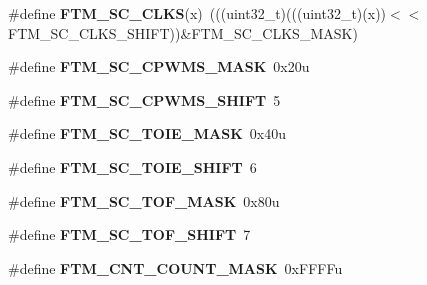 \begin{DoxyCompactItemize}
\item 
\#define {\bfseries F\+T\+M\+\_\+\+S\+C\+\_\+\+C\+L\+KS}(x)~(((uint32\+\_\+t)(((uint32\+\_\+t)(x))$<$$<$F\+T\+M\+\_\+\+S\+C\+\_\+\+C\+L\+K\+S\+\_\+\+S\+H\+I\+FT))\&F\+T\+M\+\_\+\+S\+C\+\_\+\+C\+L\+K\+S\+\_\+\+M\+A\+SK)\hypertarget{group__FTM__Register__Masks_ga4c0b108bf05899c019de06f311cb5c89}{}\label{group__FTM__Register__Masks_ga4c0b108bf05899c019de06f311cb5c89}

\item 
\#define {\bfseries F\+T\+M\+\_\+\+S\+C\+\_\+\+C\+P\+W\+M\+S\+\_\+\+M\+A\+SK}~0x20u\hypertarget{group__FTM__Register__Masks_gaccb41101ca573d24de634c5a19d13467}{}\label{group__FTM__Register__Masks_gaccb41101ca573d24de634c5a19d13467}

\item 
\#define {\bfseries F\+T\+M\+\_\+\+S\+C\+\_\+\+C\+P\+W\+M\+S\+\_\+\+S\+H\+I\+FT}~5\hypertarget{group__FTM__Register__Masks_ga91d4d626c21437a2b8b15e9a2a385727}{}\label{group__FTM__Register__Masks_ga91d4d626c21437a2b8b15e9a2a385727}

\item 
\#define {\bfseries F\+T\+M\+\_\+\+S\+C\+\_\+\+T\+O\+I\+E\+\_\+\+M\+A\+SK}~0x40u\hypertarget{group__FTM__Register__Masks_ga65e89cf2978e1c61f40b229b66b3e7c8}{}\label{group__FTM__Register__Masks_ga65e89cf2978e1c61f40b229b66b3e7c8}

\item 
\#define {\bfseries F\+T\+M\+\_\+\+S\+C\+\_\+\+T\+O\+I\+E\+\_\+\+S\+H\+I\+FT}~6\hypertarget{group__FTM__Register__Masks_ga3d59d98a90d574503733c8a1abd2e7ae}{}\label{group__FTM__Register__Masks_ga3d59d98a90d574503733c8a1abd2e7ae}

\item 
\#define {\bfseries F\+T\+M\+\_\+\+S\+C\+\_\+\+T\+O\+F\+\_\+\+M\+A\+SK}~0x80u\hypertarget{group__FTM__Register__Masks_gaeea3d5615ca8e996e87e6f9aacdfb4fb}{}\label{group__FTM__Register__Masks_gaeea3d5615ca8e996e87e6f9aacdfb4fb}

\item 
\#define {\bfseries F\+T\+M\+\_\+\+S\+C\+\_\+\+T\+O\+F\+\_\+\+S\+H\+I\+FT}~7\hypertarget{group__FTM__Register__Masks_ga1f12d6f2ddbc4a71756f2b0203ab57dd}{}\label{group__FTM__Register__Masks_ga1f12d6f2ddbc4a71756f2b0203ab57dd}

\item 
\#define {\bfseries F\+T\+M\+\_\+\+C\+N\+T\+\_\+\+C\+O\+U\+N\+T\+\_\+\+M\+A\+SK}~0x\+F\+F\+F\+Fu\hypertarget{group__FTM__Register__Masks_ga7a984be18d311688f8a369a43f9145b6}{}\label{group__FTM__Register__Masks_ga7a984be18d311688f8a369a43f9145b6}


\end{DoxyCompactItemize}

